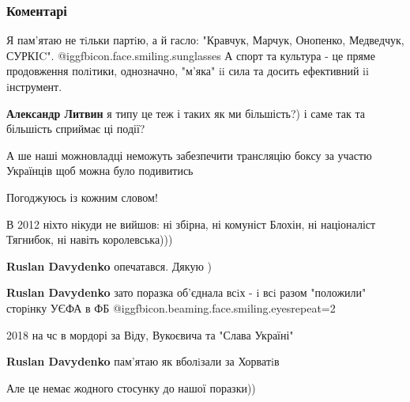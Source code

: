  
 
 
 
 
\subsubsection{Коментарі}

\begin{itemize} %

Я пам'ятаю не тiльки партiю, а й гасло: "Кравчук, Марчук, Онопенко, Медведчук,
СУРКIC". @igg{fbicon.face.smiling.sunglasses}  А спорт та культура - це пряме продовження полiтики, однозначно,
"м'яка" ii сила та досить ефективний ii iнструмент.

\begin{itemize} %
\textbf{Александр Литвин} я типу це теж і таких як ми більшість?) і саме так та більшість сприймає ці події?
\end{itemize} %

А ше наші можновладці неможуть забезпечити трансляцію боксу за участю Українців щоб можна було подивитись


Погоджуюсь із кожним словом!

В 2012 ніхто нікуди не вийшов: ні збірна, ні комуніст Блохін, ні націоналіст Тягнибок, ні навіть королевська)))

\begin{itemize} %
\textbf{Ruslan Davydenko} опечатався. Дякую )

\textbf{Ruslan Davydenko} зато поразка об'єднала всiх - i всi разом "положили" сторiнку УЄФА в ФБ @igg{fbicon.beaming.face.smiling.eyes}{repeat=2} 

2018 на чс в мордорі за Віду, Вукоєвича та "Слава Україні"

\textbf{Ruslan Davydenko} пам'ятаю як вболiзали за Хорватiв

Але це немає жодного стосунку до нашої поразки))
\end{itemize} %


\end{itemize}
